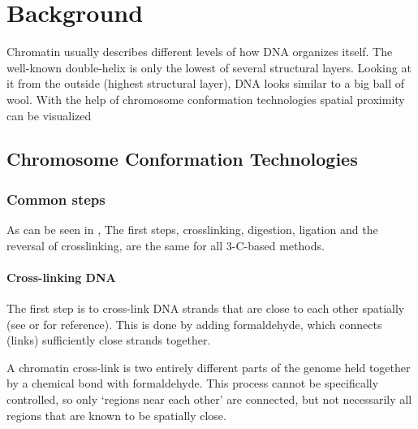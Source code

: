\chapter{Background}\label{chap:background}







Chromatin usually describes different levels of how DNA organizes itself. The
well-known double-helix is only the lowest of several structural layers.
Looking at it from the outside (highest structural layer), DNA looks similar to
a big ball of wool. With the help of chromosome conformation technologies
spatial proximity can be visualized


\section{Chromosome Conformation Technologies}\label{sec:cct}



\subsection{Common steps}\label{sec:common}

As can be seen in , The first steps, crosslinking, digestion,
ligation and the reversal of crosslinking, are the same for all 3-C-based methods.

\subsubsection{Cross-linking DNA}\label{sec:crosslinking}

The first step is to cross-link DNA strands that are close to each other
spatially (see  or  for reference). This is done by adding
formaldehyde, which connects (links) sufficiently close strands together.

A chromatin cross-link is two entirely different parts of the genome held
together by a chemical bond with formaldehyde. This process cannot be
specifically controlled, so only `regions near each other' are connected, but
not necessarily all regions that are known to be spatially close.

